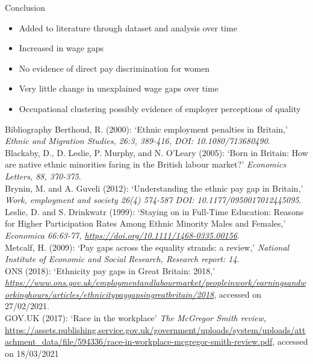 \documentclass[aspectratio=169,12pt]{beamer}
\begin{document}
\begin{frame}{Conclusion}
	 \begin{itemize}
	    \vspace{-20pt}
	    \item Added to literature through dataset and analysis over time
	    \item Increased in wage gaps
	    \item No evidence of direct pay discrimination for women
	    \item Very little change in unexplained wage gaps over time
	    \item Occupational clustering possibly evidence of employer perceptions of quality
	 \end{itemize}
\end{frame}

\begin{frame}[allowframebreaks]{Bibliography}
\footnotesize{
Berthoud, R. (2000): `Ethnic employment penalties in Britain,' \textit{Ethnic and Migration
Studies, 26:3, 389-416, DOI: 10.1080/713680490}.
\bigskip
\\Blackaby, D., D. Leslie, P. Murphy, and N. O'Leary (2005): `Born in Britain: How are native ethnic minorities faring in the British labour market?' \textit{Economics Letters, 88, 370-375}.
\bigskip
\\Brynin, M. and A. Guveli (2012): `Understanding the ethnic pay gap in Britain,' \textit{Work, employment and society 26(4) 574-587 DOI: 10.1177/0950017012445095}.
\\Leslie, D. and S. Drinkwatr (1999): `Staying on in Full-Time Education: Reasons for Higher Participation Rates Among Ethnic Minority Males and Females,' \textit{Economica 66:63-77, \url{https://doi.org/10.1111/1468-0335.00156}}.
\bigskip
\\Metcalf, H. (2009): `Pay gaps across the equality strands: a review,' \textit{National Institute of Economic and Social Research, Research report: 14}.
\bigskip
\\ONS (2018): `Ethnicity pay gaps in Great Britain: 2018,' \textit{\url{https://www.ons.gov.uk/employmentandlabourmarket/peopleinwork/earningsandworkinghours/articles/ethnicitypaygapsingreatbritain/2018}}, accessed on 27/02/2021.
\bigskip
\\GOV.UK (2017): \enquote*{Race in the workplace} \textit{The McGregor Smith review,} \url{https://assets.publishing.service.gov.uk/government/uploads/system/uploads/attachment_data/file/594336/race-in-workplace-mcgregor-smith-review.pdf}, accessed on 18/03/2021
}
\end{frame}
\end{document}
